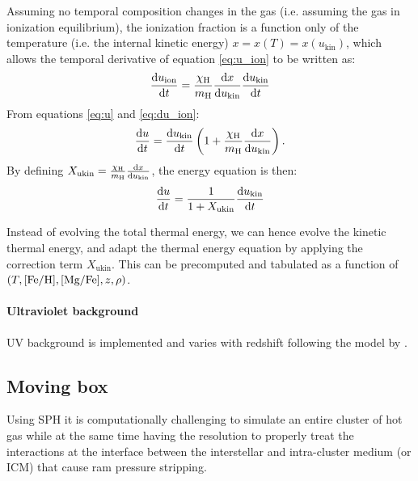 Assuming no temporal composition changes in the gas (i.e. assuming the gas in ionization equilibrium), the ionization fraction is a function only of the temperature (i.e. the internal kinetic energy) $x = x(T) = x(u_\text{kin})$, which allows the temporal derivative of equation \eqref{eq:u_ion} to be written as:
\begin{equation}
\label{eq:du_ion}
\dv{u_\text{ion}}{t} = 
\frac{\chi_\text H}{m_\text H} \dv{x}{u_\text{kin}} \dv{u_\text{kin}}{t}
\end{equation}
From equations \eqref{eq:u} and \eqref{eq:du_ion}:
\begin{equation}
\dv{u}{t} = \dv{u_\text{kin}}{t} \left( 1+\frac{\chi_\text H}{m_\text H} \dv{x}{u_\text{kin}}\right).
\end{equation}
By defining $X_\text{ukin} = \frac{\chi_\text H}{m_\text H} \dv{x}{u_\text{kin}}$,
the energy equation is then:
\begin{equation}
\dv{u}{t} = \dfrac{1}{ 1 + X_\text{ukin}} \dv{u_\text{kin}}{t}
\end{equation}

Instead of evolving the total thermal energy, we can hence evolve the kinetic thermal energy, and adapt the thermal energy equation by applying the correction term $X_\text{ukin}$.
This can be precomputed and tabulated as a function of $(T, [\text{Fe}/\text{H}], [\text{Mg}/\text{Fe}], z, \rho)$.

\paragraph{Ultraviolet background}
UV background is implemented and varies with redshift following the model by \citet{Faucher-Giguere2009}.


\subsection{Moving box}

Using SPH it is computationally challenging to simulate an entire cluster of hot gas while at the same time having the resolution to properly treat the interactions at the interface between the interstellar and intra-cluster medium (or ICM) that cause ram pressure stripping.

